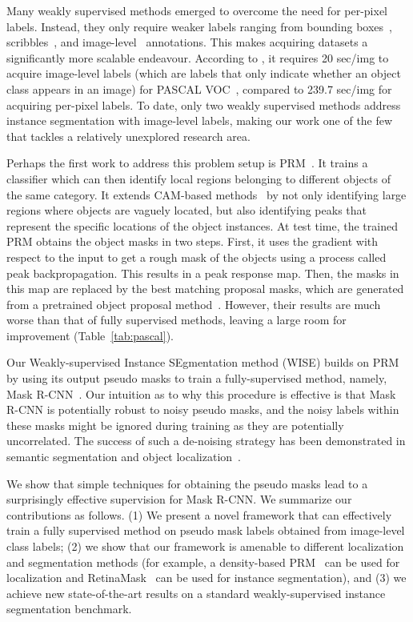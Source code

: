 \documentclass{bmvc2k}
\begin{document}
Many weakly supervised methods emerged to overcome the need for per-pixel labels. Instead, they only require weaker labels ranging from bounding boxes~\cite{khoreva2017simple}, scribbles~\cite{lin2016scribblesup}, and image-level~\cite{Zhou2018PRM, cholakkal2019object} annotations. This makes acquiring datasets a significantly more scalable endeavour. According to \citet{bearman2016s}, it requires 20 sec/img to acquire image-level labels (which are labels that only indicate whether an object class appears in an image) for PASCAL VOC~\cite{everingham2010pascal}, compared to 239.7 sec/img for acquiring per-pixel labels. To date, only two weakly supervised methods address instance segmentation with image-level labels, making our work one of the few that tackles a relatively unexplored research area.

Perhaps the first work to address this problem setup is PRM~\cite{Zhou2018PRM}. It trains a classifier which can then identify local regions belonging to different objects of the same category. It extends CAM-based methods~\cite{selvaraju2017grad, ahn2018learning} by not only identifying large regions where objects are vaguely located, but also identifying peaks that represent the specific locations of the object instances. At test time, the trained PRM obtains the object masks in two steps. First, it uses the gradient with respect to the input to get a rough mask of the objects using a process called peak backpropagation. This results in a peak response map. Then, the masks in this map are replaced by the best matching proposal masks, which are generated from a pretrained object proposal method~\cite{arbelaez2014mcg, pinheiro2016sharpmask}. However, their results are much worse than that of fully supervised methods, leaving a large room for improvement (Table~\ref{tab:pascal}).

Our Weakly-supervised Instance SEgmentation method (WISE) builds on PRM by using its output pseudo masks to train a fully-supervised method, namely, Mask R-CNN~\cite{massa2018mrcnn}. Our intuition as to why this procedure is effective is that Mask R-CNN is potentially robust to noisy pseudo masks, and the noisy labels within these masks might be ignored during training as they are potentially uncorrelated. The success of such a de-noising strategy has been demonstrated in semantic segmentation and object localization~\cite{khoreva2017simple}.

We show that simple techniques for obtaining the pseudo masks lead to a surprisingly effective supervision for Mask R-CNN. We summarize our contributions as follows. (1) We present a novel framework that can effectively train a fully supervised method on pseudo mask labels obtained from image-level class labels; (2) we show that our framework is amenable to different localization and segmentation methods (for example, a density-based PRM~\cite{cholakkal2019object} can be used for localization and RetinaMask~\cite{fu2019retinamask} can be used for instance segmentation), and (3) we achieve new state-of-the-art results on a standard weakly-supervised instance segmentation benchmark.
\end{document}
